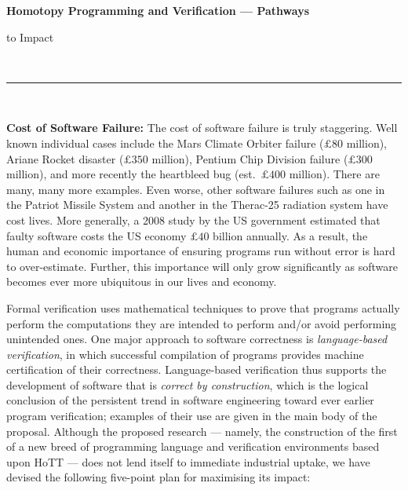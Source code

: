 \documentclass[a4paper,11pt]{article}
\begin{document}
\thispagestyle{plain}

\begin{center}

  {\Large {\bf Homotopy Programming and Verification --- Pathways

      to Impact}}\\[1ex]   



\vspace*{-0.1in}



  \rule{150mm}{.5mm}\\[2ex]

\end{center}



\noindent



\vspace*{-0.1in}

{\bf Cost of Software Failure:} The cost of software failure is truly
staggering. Well known individual cases include the Mars Climate
Orbiter failure ($\pounds 80$ million), Ariane Rocket disaster
($\pounds 350$ million), Pentium Chip Division failure ($\pounds 300$
million), and more recently the heartbleed bug (est.\ $\pounds 400$ million).
There are many, many more examples. Even worse, other
software failures such as one in the Patriot Missile System and
another in the Therac-25 radiation system have cost lives. More
generally, a 2008 study by the US government estimated that faulty
software costs the US economy $\pounds 40$ billion annually.  As a
result, the human and economic importance of ensuring programs run
without error is hard to over-estimate. Further, this importance will
only grow significantly as software becomes ever more ubiquitous in
our lives and economy.

Formal verification uses mathematical techniques to prove that
programs actually perform the computations they are intended to
perform and/or avoid performing unintended ones. One major approach to
software correctness is {\em language-based verification}, in which
successful compilation of programs provides machine certification of
their correctness. Language-based verification thus supports the
development of software that is {\em correct by construction}, which
is the logical conclusion of the persistent trend in software
engineering toward ever earlier program verification; examples of
their use are given in the main body of the proposal. Although the
proposed research --- namely, the construction of the first of a new
breed of programming language and verification environments based upon
HoTT --- does not lend itself to immediate industrial uptake, we have
devised the following five-point plan for maximising its impact:
\end{document}
